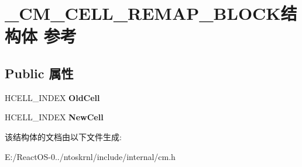 \hypertarget{struct___c_m___c_e_l_l___r_e_m_a_p___b_l_o_c_k}{}\section{\+\_\+\+C\+M\+\_\+\+C\+E\+L\+L\+\_\+\+R\+E\+M\+A\+P\+\_\+\+B\+L\+O\+C\+K结构体 参考}
\label{struct___c_m___c_e_l_l___r_e_m_a_p___b_l_o_c_k}
\subsection*{Public 属性}
\begin{DoxyCompactItemize}
\item 
\mbox{\label{struct___c_m___c_e_l_l___r_e_m_a_p___b_l_o_c_k_a1c4b2b5989e710ab5aa07d61014f63c7}} 
H\+C\+E\+L\+L\+\_\+\+I\+N\+D\+EX {\bfseries Old\+Cell}
\item 
\mbox{\label{struct___c_m___c_e_l_l___r_e_m_a_p___b_l_o_c_k_a2a080f2a23737e24a399fff6314f96ef}} 
H\+C\+E\+L\+L\+\_\+\+I\+N\+D\+EX {\bfseries New\+Cell}
\end{DoxyCompactItemize}


该结构体的文档由以下文件生成\+:\begin{DoxyCompactItemize}
\item 
E\+:/\+React\+O\+S-\/0../ntoskrnl/include/internal/cm.\+h\end{DoxyCompactItemize}
